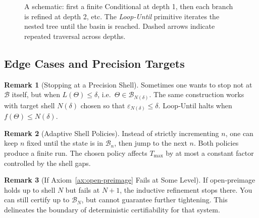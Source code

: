 \documentclass[12pt]{article}
\theoremstyle{definition}
\newtheorem{remark}{Remark}[section]
\theoremstyle{plain}
\begin{document}
\begin{figure}[h!]
\centering
{}
\caption{A schematic: first a finite Conditional at depth 1, then each branch is refined at depth 2, etc.  The \emph{Loop‑Until} primitive iterates the nested tree until the basin is reached.  Dashed arrows indicate repeated traversal across depths.}
\end{figure}

\subsection{Edge Cases and Precision Targets}
\label{subsec:edge-precision}

\begin{remark}[Stopping at a Precision Shell]
Sometimes one wants to stop not at $\mathcal B$ itself, but when $L(\Theta)\le \delta$, i.e.\ $\Theta\in\mathcal B_{N(\delta)}$.  The same construction works with target shell $N(\delta)$ chosen so that $\varepsilon_{N(\delta)}\le \delta$.  Loop‑Until halts when $f(\Theta)\le N(\delta)$.
\end{remark}

\begin{remark}[Adaptive Shell Policies]
Instead of strictly incrementing $n$, one can keep $n$ fixed until the state is in $\mathcal B_n$, then jump to the next $n$.  Both policies produce a finite run.  The chosen policy affects $T_{\max}$ by at most a constant factor controlled by the shell gaps.
\end{remark}

\begin{remark}[If Axiom~\ref{ax:open-preimage} Fails at Some Level]
If open‑preimage holds up to shell $N$ but fails at $N\!+\!1$, the inductive refinement stops there.  You can still certify up to $\mathcal B_N$, but cannot guarantee further tightening.  This delineates the boundary of deterministic certifiability for that system.
\end{remark}
\end{document}

